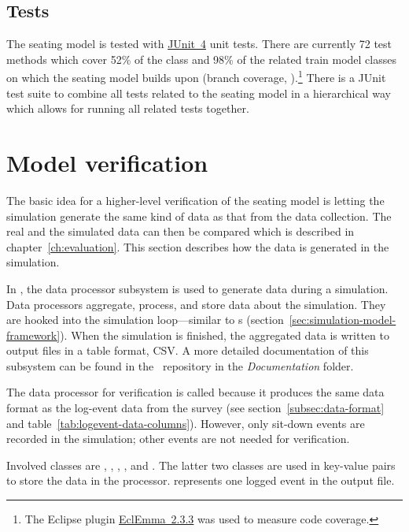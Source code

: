 \subsection{Tests}

The seating model is tested with \href{http://junit.org/junit4/}{JUnit~4} unit
tests.
There are currently 72 %
test methods which cover 52\% of the  class and 98\% of the
related train model classes on which the seating model builds upon (branch
coverage, \citep{myers2004art}).\footnote{
  The Eclipse plugin \href{http://www.eclemma.org/}{EclEmma~2.3.3} was used to
  measure code coverage.}
There is a JUnit test suite to combine all tests related to the
seating model in a hierarchical way which allows for running all related tests
together.

\section{Model verification}
\label{sec:model-verification}

The basic idea for a higher-level verification of the seating model is letting
the simulation generate the same kind of data as that from the data collection.
The real and the simulated data can then be compared which is described in
chapter~\ref{ch:evaluation}.
This section describes how the data is generated in the simulation.

In \vadere, the data processor subsystem is used to generate data during a
simulation.
Data processors aggregate, process, and store data about the simulation.
They are hooked into the simulation loop---similar to
s (section~\ref{sec:simulation-model-framework}).
When the simulation is finished, the aggregated data is written to output files
in a table format, \eg \acs{CSV}.
A more detailed documentation of this subsystem can be found in the \vadere\
repository in the \emph{Documentation} folder.

The data processor for verification is called  because it
produces the same data format as the log-event data from the survey (see
section~\ref{subsec:data-format} and table~\ref{tab:logevent-data-columns}).
However, only sit-down events are recorded in the simulation; other events are
not needed for verification.

Involved classes are ,
, , ,
and \code{LogEventEntry}.
The latter two classes are used in key-value pairs to store the data in the
processor.
 represents one logged event in the output file.

